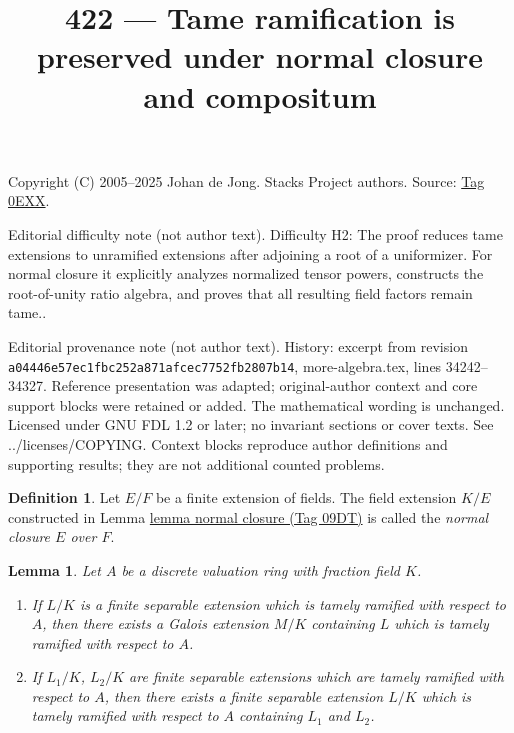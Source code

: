 \documentclass{amsart}
\theoremstyle{plain}
\newtheorem{lemma}[subsection]{Lemma}
\theoremstyle{definition}
\newtheorem{definition}[subsection]{Definition}
\theoremstyle{remark}
\numberwithin{equation}{subsection}
\begin{document}
\title[Stacks Project, Tag 0EXX]{422 --- Tame ramification is preserved under normal closure and compositum}
\maketitle
\noindent Copyright (C) 2005--2025 Johan de Jong. Stacks Project authors. Source: \href{https://stacks.math.columbia.edu/tag/0EXX}{Tag 0EXX}.

\noindent Editorial difficulty note (not author text). Difficulty H2: The proof reduces tame extensions to unramified extensions after adjoining a root of a uniformizer. For normal closure it explicitly analyzes normalized tensor powers, constructs the root-of-unity ratio algebra, and proves that all resulting field factors remain tame..

\noindent Editorial provenance note (not author text). History: excerpt from revision \texttt{a0444\allowbreak 6e57e\allowbreak c1fbc\allowbreak 252a8\allowbreak 71afc\allowbreak ec775\allowbreak 2fb28\allowbreak 07b14}, more-algebra.tex, lines 34242--34327. Reference presentation was adapted; original-author context and core support blocks were retained or added. The mathematical wording is unchanged. Licensed under GNU FDL 1.2 or later; no invariant sections or cover texts. See ../licenses/COPYING. Context blocks reproduce author definitions and supporting results; they are not additional counted problems.

\begin{definition}
\label{fields-definition-normal-closure}
Let $E/F$ be a finite extension of fields. The field extension $K/E$
constructed in Lemma \href{https://stacks.math.columbia.edu/tag/09DT}{lemma normal closure (Tag 09DT)}
is called the {\it normal closure $E$ over $F$}.
\end{definition}

\begin{lemma}
\label{lemma-permanence-tame}
Let $A$ be a discrete valuation ring with fraction field $K$.
\begin{enumerate}
\item If $L/K$ is a finite separable extension which is tamely
ramified with respect to $A$, then there exists a Galois
extension $M/K$ containing $L$ which is tamely ramified
with respect to $A$.
\item If $L_1/K$, $L_2/K$ are finite separable extensions which are tamely
ramified with respect to $A$, then there exists a finite
separable extension $L/K$ which is tamely ramified with respect
to $A$ containing $L_1$ and $L_2$.
\end{enumerate}
\end{lemma}
\end{document}
